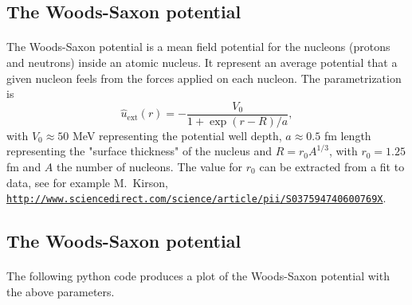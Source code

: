 \documentclass[%
twoside,                 %
final,                   %
10pt]{article}
\begin{document}
\subsection*{The Woods-Saxon potential}

\paragraph{}
The Woods-Saxon potential is a mean field potential for the nucleons (protons and neutrons) 
inside an atomic nucleus. It represent an average potential that a given nucleon feels from  the forces applied on each nucleon. 
The parametrization is
\[
\hat{u}_{\mathrm{ext}}(r)=-\frac{V_0}{1+\exp{(r-R)/a}},
\]
with $V_0\approx 50$ MeV representing the potential well depth, $a\approx 0.5$ fm 
length representing the "surface thickness" of the nucleus and $R=r_0A^{1/3}$, with $r_0=1.25$ fm and $A$ the number of nucleons.
The value for $r_0$ can be extracted from a fit to data, see for example M.~Kirson, \href{{http://www.sciencedirect.com/science/article/pii/S037594740600769X}}{\nolinkurl{http://www.sciencedirect.com/science/article/pii/S037594740600769X}}.




\subsection*{The Woods-Saxon potential}

\paragraph{}
The following python code produces a plot of the Woods-Saxon potential with the above parameters. 
\end{document}
